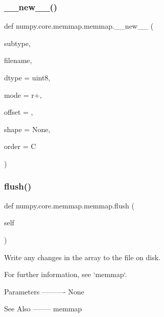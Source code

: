 \mbox{\label{classnumpy_1_1core_1_1memmap_1_1memmap_a1381dc62dcae10138a3bb342bfe922a4}} 
\subsubsection{\texorpdfstring{\+\_\+\+\_\+new\+\_\+\+\_\+()}{\_\_new\_\_()}}
{\footnotesize\ttfamily def numpy.\+core.\+memmap.\+memmap.\+\_\+\+\_\+new\+\_\+\+\_\+ (\begin{DoxyParamCaption}\item[{}]{subtype,  }\item[{}]{filename,  }\item[{}]{dtype = {\ttfamily uint8},  }\item[{}]{mode = {\ttfamily \textquotesingle{}r+\textquotesingle{}},  }\item[{}]{offset = {},  }\item[{}]{shape = {\ttfamily None},  }\item[{}]{order = {\ttfamily \textquotesingle{}C\textquotesingle{}} }\end{DoxyParamCaption})}

\mbox{\label{classnumpy_1_1core_1_1memmap_1_1memmap_a584744d69f6cae686962a274fb4d2782}} 
\subsubsection{\texorpdfstring{flush()}{flush()}}
{\footnotesize\ttfamily def numpy.\+core.\+memmap.\+memmap.\+flush (\begin{DoxyParamCaption}\item[{}]{self }\end{DoxyParamCaption})}

\begin{DoxyVerb}Write any changes in the array to the file on disk.

For further information, see `memmap`.

Parameters
----------
None

See Also
--------
memmap\end{DoxyVerb}
 

